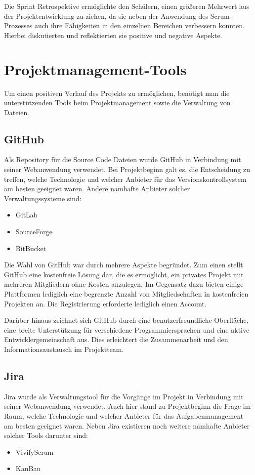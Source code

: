 Die Sprint Retrospektive ermöglichte den Schülern, einen größeren Mehrwert aus der Projektentwicklung zu ziehen, da sie
neben der Anwendung des Scrum-Prozesses auch ihre Fähigkeiten in den einzelnen Bereichen verbessern konnten. Hierbei
diskutierten und reflektierten sie positive und negative Aspekte.

\section{Projektmanagement-Tools}
Um einen positiven Verlauf des Projekts zu ermöglichen, benötigt man die unterstützenden
Tools beim Projektmanagement sowie die Verwaltung von Dateien.

\subsection{GitHub}
Als Repository für die Source Code Dateien wurde GitHub in Verbindung mit seiner Webanwendung verwendet. Bei Projektbeginn
galt es, die Entscheidung zu treffen, welche Technologie und welcher Anbieter für das Versionskontrollsystem am besten
geeignet waren.
Andere namhafte Anbieter solcher Verwaltungssysteme sind:
\begin{itemize}
    \item GitLab
    \item SourceForge
    \item BitBucket
\end{itemize}

Die Wahl von GitHub war durch mehrere Aspekte begründet. Zum einen stellt GitHub eine kostenfreie Lösung dar, die es
ermöglicht, ein privates Projekt mit mehreren Mitgliedern ohne Kosten anzulegen. Im Gegensatz dazu bieten einige Plattformen
lediglich eine begrenzte Anzahl von Mitgliedschaften in kostenfreien Projekten an. Die Registrierung erforderte lediglich
einen Account.

Darüber hinaus zeichnet sich GitHub durch eine benutzerfreundliche Oberfläche, eine breite Unterstützung für verschiedene
Programmiersprachen und eine aktive Entwicklergemeinschaft aus. Dies erleichtert die Zusammenarbeit und den Informationsaustausch
im Projektteam.

\subsection{Jira}
Jira wurde als Verwaltungstool für die Vorgänge im Projekt in Verbindung mit seiner Webanwendung verwendet. Auch hier
stand zu Projektbeginn die Frage im Raum, welche Technologie und welcher Anbieter für das Aufgabenmanagement am besten
geeignet waren.
Neben Jira existieren noch weitere namhafte Anbieter solcher Tools darunter sind:
\begin{itemize}
    \item VivifyScrum
    \item KanBan
\end{itemize}

